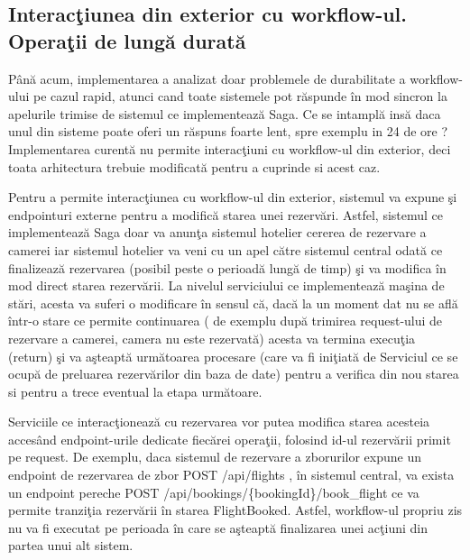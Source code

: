 \documentclass[a4paper,12pt]{report}
\begin{document}
\subsection{Interacţiunea din exterior cu workflow-ul. Operaţii de lungă durată}
\par Până acum, implementarea a analizat doar problemele de durabilitate a workflow-ului pe cazul rapid, atunci cand toate sistemele pot răspunde în mod sincron la apelurile trimise de sistemul ce implementează Saga. Ce se intamplă insă daca unul din sisteme poate oferi un răspuns foarte lent, spre exemplu in 24 de ore ? Implementarea curentă nu permite interacţiuni cu workflow-ul din exterior, deci toata arhitectura trebuie modificată pentru a cuprinde si acest caz. 
\par Pentru a permite interacţiunea cu workflow-ul din exterior, sistemul va expune şi endpointuri externe pentru a modifică starea unei rezervări. Astfel, sistemul ce implementează Saga doar va anunţa sistemul hotelier cererea de rezervare a camerei iar sistemul hotelier va veni cu un apel către sistemul central odată ce finalizează rezervarea (posibil peste o perioadă lungă de timp) şi va modifica în mod direct starea rezervării. La nivelul serviciului ce implementează maşina de stări, acesta va suferi o modificare în sensul că, dacă la un moment dat nu se află într-o stare ce permite continuarea ( de exemplu după trimirea request-ului de rezervare a camerei, camera nu este rezervată) acesta va termina execuţia (return) şi va aşteaptă următoarea procesare (care va fi iniţiată de Serviciul ce se ocupă de preluarea rezervărilor din baza de date) pentru a verifica din nou starea si pentru a trece eventual la etapa următoare. 
\par Serviciile ce interacţionează cu rezervarea vor putea modifica starea acesteia accesând endpoint-urile dedicate fiecărei operaţii, folosind id-ul rezervării primit pe request. De exemplu, daca sistemul de rezervare a zborurilor expune un endpoint de rezervarea de zbor POST \slash api\slash flights , în sistemul central, va exista un endpoint pereche POST \slash api\slash bookings\slash \{bookingId\}\slash book\_flight ce va permite tranziţia rezervării în starea FlightBooked. Astfel, workflow-ul propriu zis nu va fi executat pe perioada în care se aşteaptă finalizarea unei acţiuni din partea unui alt sistem. 
\end{document}
